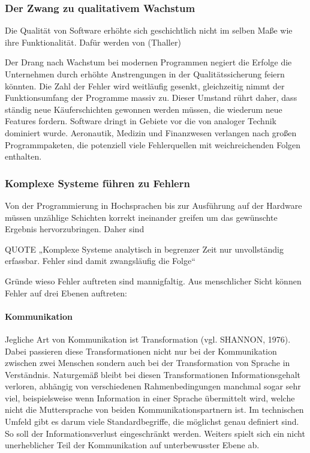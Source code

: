 \subsubsection{Der Zwang zu qualitativem Wachstum}
Die Qualität von Software erhöhte sich geschichtlich nicht im selben Maße wie ihre Funktionalität. Dafür werden von (Thaller)\cite{thaller_software-test:_2002}

Der Drang nach Wachstum bei modernen Programmen negiert die Erfolge die Unternehmen durch erhöhte Anstrengungen in der Qualitätssicherung feiern könnten. Die Zahl der Fehler wird weitläufig gesenkt,  gleichzeitig nimmt der Funktionsumfang der Programme massiv zu. Dieser Umstand rührt daher, dass ständig neue Käuferschichten gewonnen werden müssen, die wiederum neue Features fordern.
Software dringt in Gebiete vor die von analoger Technik dominiert wurde. Aeronautik, Medizin und Finanzwesen verlangen nach großen Programmpaketen, die potenziell viele Fehlerquellen mit weichreichenden Folgen enthalten.

\subsubsection{Komplexe Systeme führen zu Fehlern}
Von der Programmierung in Hochsprachen bis zur Ausführung auf der Hardware müssen unzählige Schichten korrekt ineinander greifen um das gewünschte Ergebnis hervorzubringen. 
Daher sind

QUOTE „Komplexe Systeme analytisch in begrenzer Zeit nur unvollständig erfassbar. Fehler sind damit zwangsläufig die Folge“ \cite{vigenschow_objektorientiertes_2004}

Gründe wieso Fehler auftreten sind mannigfaltig. Aus menschlicher Sicht können Fehler auf drei Ebenen auftreten: \cite{vigenschow_objektorientiertes_2004}


\paragraph{Kommunikation}
Jegliche Art von Kommunikation ist Transformation (vgl. SHANNON, 1976). Dabei passieren diese Transformationen nicht nur bei der Kommunikation zwischen zwei Menschen sondern auch bei der Transformation von Sprache in Verständnis. Naturgemäß bleibt bei diesen Transformationen Informationsgehalt verloren, abhängig von verschiedenen Rahmenbedingungen manchmal sogar sehr viel, beispielsweise wenn Information in einer Sprache übermittelt wird, welche nicht die Muttersprache von beiden Kommunikationspartnern ist.
Im technischen Umfeld gibt es darum viele Standardbegriffe, die möglichst genau definiert sind. So soll der Informationsverlust eingeschränkt werden.
Weiters spielt sich ein nicht unerheblicher Teil der Kommunikation auf unterbewusster Ebene ab.

